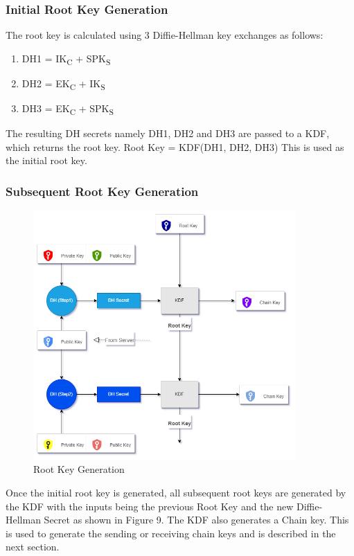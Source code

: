 \subsubsection{Initial Root Key Generation}
The root key is calculated using 3 Diffie-Hellman key exchanges as follows:
\begin{enumerate}
    \item DH1 = IK\textsubscript{C}   +  SPK\textsubscript{S}
    \item DH2 = EK\textsubscript{C}   +  IK\textsubscript{S}
    \item DH3 = EK\textsubscript{C}   +  SPK\textsubscript{S}
\end{enumerate}

The resulting DH secrets namely DH1, DH2 and DH3 are passed to a KDF, which returns the root key.
Root Key = KDF(DH1, DH2, DH3)
This is used as the initial root key.

\subsubsection{Subsequent Root Key Generation}
\begin{figure}[ht!]
\centering
\includegraphics[width= 100mm]{./images/security_overview1-Root Key Generation.png}
\caption{Root Key Generation}
\end{figure}

Once the initial root key is generated, all subsequent root keys are generated by the KDF with the inputs being the previous Root Key and the new Diffie-Hellman Secret as shown in Figure 9. The KDF also generates a Chain key. This is used to generate the sending or receiving chain keys and is described in the next section.


